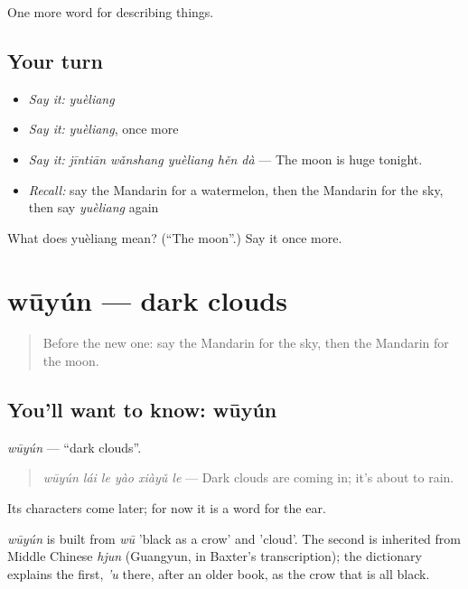 \begin{grammarlens}[title={What you've built}]
One more word for describing things.
\end{grammarlens}

\subsection*{Your turn}
\begin{itemize}
\raggedright
  \item \emph{Say it:} \emph{yuèliang}
  \item \emph{Say it:} \emph{yuèliang}, once more
  \item \emph{Say it:} \emph{jīntiān wǎnshang yuèliang hěn dà} — The moon is huge tonight.
  \item \emph{Recall:} say the Mandarin for a watermelon, then the Mandarin for the sky, then say \emph{yuèliang} again
\end{itemize}

\begin{tcolorbox}[breakable,colback=teal!4,colframe=teal!35!black,title={Before you move on}]
What does yuèliang mean? (\textquotedblleft{}The moon\textquotedblright{}.) Say it once more.
\end{tcolorbox}
\section[wūyún]{wūyún — dark clouds}

\label{lesson:ZH-C238-wuyun}



\begin{quote}
Before the new one: say the Mandarin for the sky, then the Mandarin for the moon.
\end{quote}

\subsection*{You'll want to know: wūyún}
\emph{wūyún} — \textquotedblleft{}dark clouds\textquotedblright{}.

\begin{quote}
\emph{wūyún lái le yào xiàyǔ le} — Dark clouds are coming in; it's about to rain.
\end{quote}

Its characters come later; for now it is a word for the ear.

\begin{cousinweb}
\emph{wūyún} is built from \emph{wū} 'black as a crow' and  'cloud'. The second is inherited from Middle Chinese \emph{hjun} (Guangyun, in Baxter's transcription); the dictionary explains the first, \emph{'u} there, after an older book, as the crow that is all black.
\end{cousinweb}

